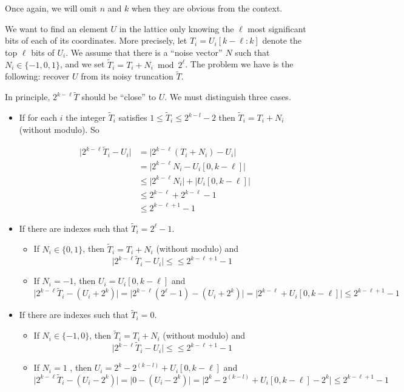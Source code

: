 \documentclass[submission,svgnames,journal=tosc]{iacrtrans}
\begin{document}
Once again, we will omit $n$ and $k$ when they are obvious from the context.

We want to find an element \(U\) in the lattice only knowing the $\ell$ most significant bits of each of its coordinates.  More precisely, let $T_i = U_i[k-\ell:k]$ denote the top $\ell$ bits of $U_i$. We assume that there is a ``noise vector'' $N$ such that $N_i \in \{-1, 0, 1\}$, and we set $\widetilde{T}_i = T_i + N_i \bmod 2^{\ell}$. The problem we have is the  following: recover $U$ from its noisy truncation $\widetilde{T}$.

In principle, $2^{k-\ell} \widetilde{T}$ should be ``close'' to \(U\). We must distinguish three cases.
\begin{itemize}
	\item If for each \(i\) the integer \(\widetilde{T}_i\) satisfies \(1\leqslant\widetilde{T}_i\leqslant 2^{k-l}-2\) then \(\widetilde{T}_i = T_i + N_i\) (without modulo). So
	
	\begin{align*}
	\lvert 2^{k-\ell}\widetilde{T}_i-U_i \rvert &=\lvert 2^{k-\ell}(T_i + N_i)-U_i \rvert \\
	 &= \lvert 2^{k-\ell}N_i - U_i[0,k-\ell] \rvert\\
	 &\leqslant \lvert 2^{k-\ell}N_i\rvert + \lvert U_i[0,k-\ell] \rvert \\
	 &\leqslant 2^{k-\ell} + 2^{k-\ell}-1\\
	 &\leqslant 2^{k-\ell +1 }- 1
	\end{align*}
	
	\item If there are indexes such that \(\widetilde{T}_i = 2^\ell-1\).
	\begin{itemize}
		\item If \(N_i \in \{0,1\}\), then \(\widetilde{T}_i = T_i + N_i\) (without modulo) and \[\lvert 2^{k-\ell}\widetilde{T}_i-U_i \rvert \leqslant \leqslant 2^{k-\ell +1 }- 1\]
		\item If \(N_i = -1\), then \(U_i=U_i[0,k-\ell]\) and  \[\lvert 2^{k-\ell}\widetilde{T}_i-(U_i + 2^k) \rvert =\lvert 2^{k-\ell}(2^\ell -1) -(U_i + 2^k) \rvert = \lvert 2^{k-\ell} + U_i[0,k-\ell]\rvert \leqslant 2^{k-\ell + 1} -1 \]
	\end{itemize}

	\item If there are indexes such that \(\widetilde{T}_i = 0\).
	\begin{itemize}
		\item  If  \(N_i \in \{-1,0\}\), then \(\widetilde{T}_i = T_i + N_i\) (without modulo) and \[\lvert 2^{k-\ell}\widetilde{T}_i-U_i \rvert \leqslant \leqslant 2^{k-\ell +1 }- 1\]
		\item If \(N_i = 1\) , then \(U_i= 2^k-2^(k-l) + U_i[0,k-\ell]\) and  \[\lvert 2^{k-\ell}\widetilde{T}_i-(U_i - 2^k) \rvert =\lvert 0 -(U_i - 2^k) \rvert = \lvert 2^k-2^(k-l) + U_i[0,k-\ell] - 2^k\rvert \leqslant 2^{k-\ell + 1} -1 \]
	\end{itemize}
\end{itemize}
\end{document}
